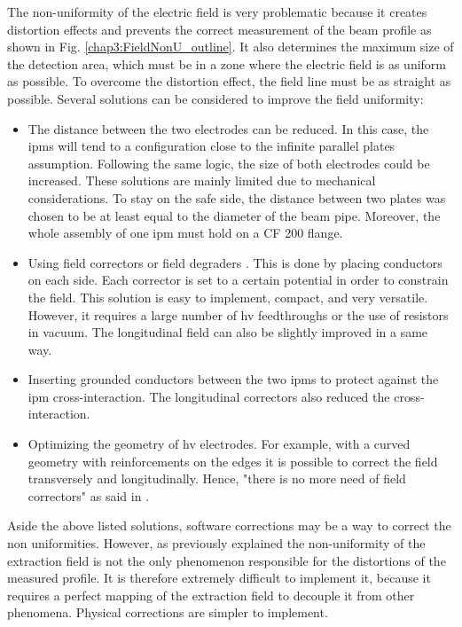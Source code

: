 \begin{refsection}
  The non-uniformity of the electric field is very problematic because it creates distortion effects and prevents the correct measurement of the beam profile as shown in Fig. \ref{chap3:FieldNonU_outline}. It also determines the maximum size of the detection area, which must be in a zone where the electric field is as uniform as possible. To overcome the distortion effect, the field line must be as straight as possible. Several solutions can be considered to improve the field uniformity:
  \begin{itemize}
    \item The distance between the two electrodes can be reduced. In this case, the \acrshort{ipm}s will tend to a configuration close to the infinite parallel plates assumption. Following the same logic, the size of both electrodes could be increased. These solutions are mainly limited due to mechanical considerations. To stay on the safe side, the distance between two plates was chosen to be at least equal to the diameter of the beam pipe. Moreover, the whole assembly of one \acrshort{ipm} must hold on a CF 200 flange.
    \item Using field correctors or field degraders \cite[p. 103]{egberts2012}. This is done by placing conductors on each side. Each corrector is set to a certain potential in order to constrain the field. This solution is easy to implement, compact, and very versatile. However, it requires a large number of \acrshort{hv} feedthroughs or the use of resistors in vacuum. The longitudinal field can also be slightly improved in a same way.
    \item Inserting grounded conductors between the two \acrshort{ipm}s \cite[p. 132]{egberts2012} to protect against the \acrshort{ipm} cross-interaction. The longitudinal correctors also reduced the cross-interaction.
    \item Optimizing the geometry of \acrshort{hv} electrodes. For example, with a curved geometry with reinforcements on the edges it is possible to correct the field transversely and longitudinally. Hence, "there is no more need of field correctors" as said in \cite{Bartkoski2014}.
  \end{itemize}
  Aside the above listed solutions, software corrections may be a way to correct the non uniformities. However, as previously explained the non-uniformity of the extraction field is not the only phenomenon responsible for the distortions of the measured profile. It is therefore extremely difficult to implement it, because it requires a perfect mapping of the extraction field to decouple it from other phenomena. Physical corrections are simpler to implement.


\end{refsection}
